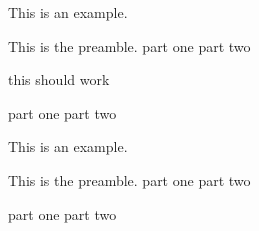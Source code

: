 \documentclass{article}
\begin{document}
\begingroup
{}

\ex This is an example.\xe

\pex
This is the preamble.
\a part one
\a part two
\xe

\pex
this should work
\xe

\pex
\a part one
\a part two
\xe



\endgroup

\ex This is an example.\xe

\pex
This is the preamble.
\a part one
\a part two
\xe

\pex
\a part one
\a part two
\xe
\end{document}
